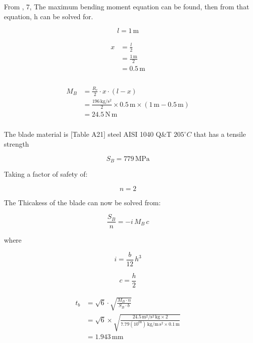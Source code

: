\documentclass[11pt]{article}
\begin{document}
From \cite[Table A-9]{shigley}, 7, The maximum bending moment equation can be found, then from that equation, h can be solved for.

\begin{equation}
l	= 1\,\mathrm{m}
\end{equation}

\begin{align}
\begin{split}
x	&= \frac{l}{2}\\
	&= \frac{1\,\mathrm{m}}{2}\\
	&= 0.5\,\mathrm{m}\\
\end{split}
\end{align}

\begin{align}
\begin{split}
M_{B}	&= \frac{R_{c}}{2} \cdot x \cdot \left(l - x\right)\\
		&= \frac{196\,\mathrm{{kg}\slash{s^{2}}}}{2} \times 0.5\,\mathrm{m} \times \left(1\,\mathrm{m} - 0.5\,\mathrm{m}\right)\\
		&= 24.5\,\mathrm{N \, m}\\
\end{split}
\end{align}

The blade material is [Table A21] steel AISI 1040 Q\&T $205^\circ C$ that has a tensile strength

\begin{equation}
S_{B}	= 779\,\mathrm{MPa}
\end{equation}

Taking a factor of safety of:

\begin{equation}
n	= 2
\end{equation}

The Thicakess of the blade can now be solved from:

\begin{equation}
\frac{S_{B}}{n}=- i \, M_{B} \, c
\end{equation}

where

\begin{equation}
i=\frac{b}{12} \, h^{3}
\end{equation}

\begin{equation}
c=\frac{h}{2}
\end{equation}

\begin{align}
\begin{split}
t_{b}	&= \sqrt{6} \cdot \sqrt{\frac{M_{B} \cdot n}{S_{B} \cdot b}}\\
		&= \sqrt{6} \times \sqrt{\frac{24.5\,\mathrm{{m^{2}}\slash{s^{2}} \, kg} \times 2}{7.79(10^{08})\,\mathrm{{kg}\slash{m \, s^{2}}} \times 0.1\,\mathrm{m}}}\\
		&= 1.943\,\mathrm{mm}\\
\end{split}
\end{align}
\end{document}
